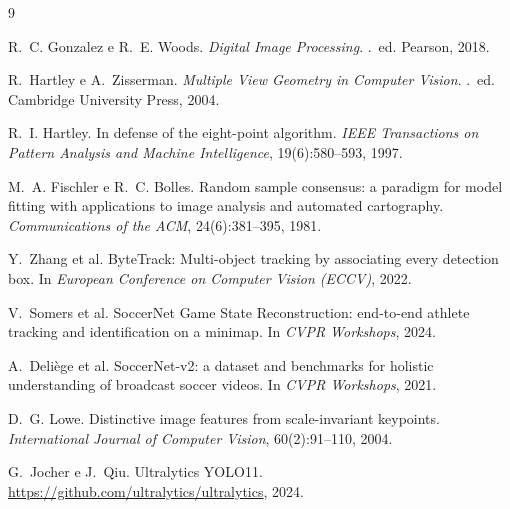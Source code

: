 \documentclass[12pt]{article}
\begin{document}
\begin{thebibliography}{9}

R.~C. Gonzalez e R.~E. Woods.
\newblock \emph{Digital Image Processing}.
.~ed. Pearson, 2018.

R.~Hartley e A.~Zisserman.
\newblock \emph{Multiple View Geometry in Computer Vision}.
.~ed. Cambridge University Press, 2004.

R.~I. Hartley.
\newblock In defense of the eight-point algorithm.
\newblock \emph{IEEE Transactions on Pattern Analysis and Machine Intelligence}, 19(6):580--593, 1997.

M.~A. Fischler e R.~C. Bolles.
\newblock Random sample consensus: a paradigm for model fitting with applications to image analysis and automated cartography.
\newblock \emph{Communications of the ACM}, 24(6):381--395, 1981.

Y.~Zhang et al.
\newblock ByteTrack: Multi-object tracking by associating every detection box.
\newblock In \emph{European Conference on Computer Vision (ECCV)}, 2022.

V.~Somers et al.
\newblock SoccerNet Game State Reconstruction: end-to-end athlete tracking and identification on a minimap.
\newblock In \emph{CVPR Workshops}, 2024.

A.~Deliège et al.
\newblock SoccerNet-v2: a dataset and benchmarks for holistic understanding of broadcast soccer videos.
\newblock In \emph{CVPR Workshops}, 2021.

D.~G. Lowe.
\newblock Distinctive image features from scale-invariant keypoints.
\newblock \emph{International Journal of Computer Vision}, 60(2):91--110, 2004.

G.~Jocher e J.~Qiu.
\newblock Ultralytics YOLO11.
\newblock \url{https://github.com/ultralytics/ultralytics}, 2024.

\end{thebibliography}
\end{document}
